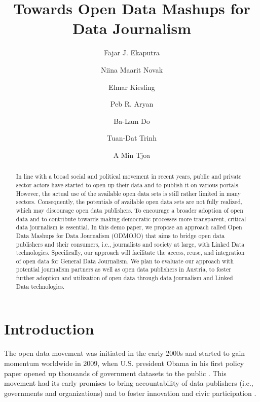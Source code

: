 \documentclass[runningheads,a4paper]{llncs}
\begin{document}
\mainmatter

\title{Towards Open Data Mashups for Data Journalism}
\author{Fajar J. Ekaputra \and
Niina Maarit Novak \and
Elmar Kiesling \and
Peb R. Aryan \and
Ba-Lam Do \and
Tuan-Dat Trinh \and
A Min Tjoa}
\maketitle

\begin{abstract}
In line with a broad social and political movement in recent years, public and private sector actors have started to open up their data and to publish it on various portals. However, the actual use of the available open data sets is still rather limited in many sectors. Consequently, the potentials of available open data sets are not fully realized, which may discourage open data publishers. To encourage a broader adoption of open data and to contribute towards making democratic processes more transparent, critical data journalism is essential. In this demo paper, we propose an approach called Open Data Mashups for Data Journalism (ODMOJO) that aims to bridge open data publishers and their consumers, i.e., journalists and society at large, with Linked Data technologies. Specifically, our approach will facilitate the access, reuse, and integration of open data for General Data Journalism. We plan to evaluate our approach with potential journalism partners as well as open data publishers in Austria, to foster further adoption and utilization of open data through data journalism and Linked Data technologies.

\end{abstract}


\section{Introduction}

The open data movement was initiated in the early 2000s and started to gain momentum worldwide in 2009, when U.S. president Obama in his first policy paper opened up thousands of government datasets to the public  \cite{_Ref490833618}. This movement had its early promises to bring accountability of data publishers (i.e., governments and organizations) and to foster innovation and civic participation  \cite{_Ref490833928}. 
\end{document}
